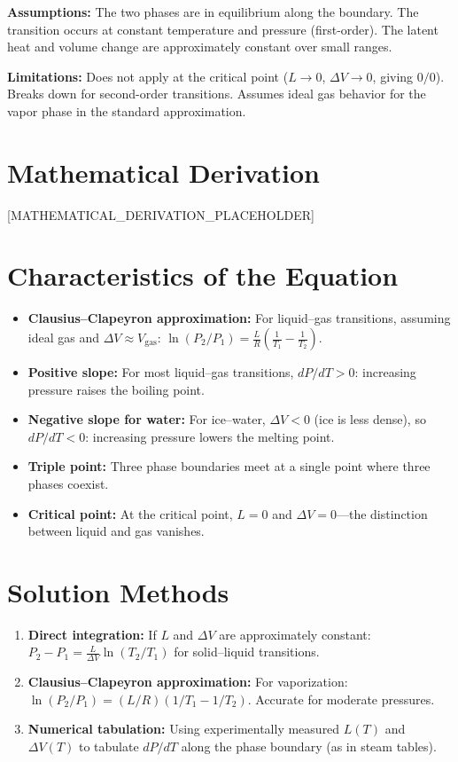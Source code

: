 \documentclass[11pt,openright]{book}
\begin{document}
\textbf{Assumptions:} The two phases are in equilibrium along the boundary. The transition occurs at constant temperature and pressure (first-order). The latent heat and volume change are approximately constant over small ranges.


\textbf{Limitations:} Does not apply at the critical point ($L \to 0$, $\Delta V \to 0$, giving $0/0$). Breaks down for second-order transitions. Assumes ideal gas behavior for the vapor phase in the standard approximation.


\section*{Mathematical Derivation}

[MATHEMATICAL_DERIVATION_PLACEHOLDER]

\section*{Characteristics of the Equation}

\begin{itemize}
\item \textbf{Clausius--Clapeyron approximation:} For liquid--gas transitions, assuming ideal gas and $\Delta V \approx V_{\text{gas}}$: $\ln(P_2/P_1) = \frac{L}{R}\left(\frac{1}{T_1} - \frac{1}{T_2}\right)$.
\item \textbf{Positive slope:} For most liquid--gas transitions, $dP/dT > 0$: increasing pressure raises the boiling point.
\item \textbf{Negative slope for water:} For ice--water, $\Delta V < 0$ (ice is less dense), so $dP/dT < 0$: increasing pressure lowers the melting point.
\item \textbf{Triple point:} Three phase boundaries meet at a single point where three phases coexist.
\item \textbf{Critical point:} At the critical point, $L = 0$ and $\Delta V = 0$---the distinction between liquid and gas vanishes.
\end{itemize}
\section*{Solution Methods}

\begin{enumerate}
\item \textbf{Direct integration:} If $L$ and $\Delta V$ are approximately constant: $P_2 - P_1 = \frac{L}{\Delta V} \ln(T_2/T_1)$ for solid--liquid transitions.
\item \textbf{Clausius--Clapeyron approximation:} For vaporization: $\ln(P_2/P_1) = (L/R)(1/T_1 - 1/T_2)$. Accurate for moderate pressures.
\item \textbf{Numerical tabulation:} Using experimentally measured $L(T)$ and $\Delta V(T)$ to tabulate $dP/dT$ along the phase boundary (as in steam tables).
\end{enumerate}
\end{document}
